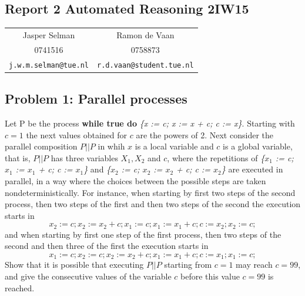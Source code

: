\documentclass[12pt]{article}
\begin{document}
\begin{center}
\section*{Report 2 Automated Reasoning 2IW15 }
\end{center}
\begin{center}
\begin{tabular}{c c}
Jasper Selman & Ramon de Vaan\\
0741516 & 0758873\\
{\tt j.w.m.selman@tue.nl} & {\tt r.d.vaan@student.tue.nl}
\end{tabular}
\end{center}

\vspace{8mm}

\subsection*{Problem 1: Parallel processes}

Let P be the process \textbf{while true do} \textit{\{x := c; x := x + c; c := x\}}. Starting with $c = 1$ the next values obtained for $c$ are the powers of 2. Next consider the parallel composition $P||P$ in whih $x$ is a local variable and $c$ is a global variable, that is, $P||P$ has three variables $X_1, X_2$ and $c$, where the repetitions of \textit{\{$x_1$ := c; $x_1$ := $x_1$ + c; c := $x_1$\}} and \textit{\{$x_2$ := c;  $x_2$ :=  $x_2$ + c; c := $x_2$\}} are executed in parallel, in a way where the choices between the possible steps are taken nondeterministically. For instance, when starting by first two steps of the second process, then two steps of the first and then two steps of the second the execution starts in
\[x_2 := c;  x_2 :=  x_2 + c; x_1 := c; x_1 := x_1 + c; c := x_2; x_2 := c;\]
and when starting  by first one step of the first process, then two steps of the second and then three of the first the execution starts in
\[x_1 := c; x_2 := c; x_2 :=  x_2 + c;  x_1 := x_1 + c; c := x_1; x_1 := c;\]
Show that it is possible that executing $P||P$ starting from $c = 1$ may reach $c = 99$, and give the consecutive values of the variable $c$ before this value $c = 99$ is reached.

\vspace{5mm}
\end{document}
